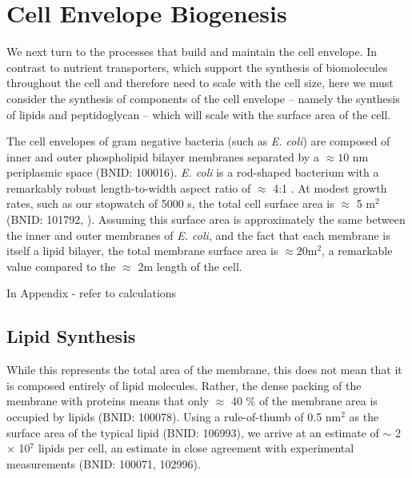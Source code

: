 \section{Cell Envelope Biogenesis}
We next turn to the processes that build and maintain the cell envelope.
In contrast to nutrient transporters, which support the synthesis of biomolecules
throughout the cell and therefore need to scale with the cell size,
here we must consider the synthesis of components of the cell envelope -- namely the synthesis of
lipids and peptidoglycan -- which will scale with the surface area of the cell.

The cell envelopes of gram negative bacteria (such as \textit{E. coli}) are
composed of inner and outer phospholipid bilayer membranes separated by a
$\approx 10$ nm periplasmic space (BNID: 100016). \textit{E. coli} is a
rod-shaped bacterium with a remarkably robust length-to-width aspect ratio of
$\approx$ 4:1 \citep{harris2018}. At modest growth rates, such as our stopwatch of
5000 s, the total cell surface area is $\approx$ 5 \textmu m$^2$ (BNID: 101792,
\cite{milo2010}). Assuming this surface area is approximately the same between
the inner and outer membranes of \textit{E. coli}, and the fact that each
membrane is itself a lipid bilayer, the total membrane surface area is $\approx 20$\textmu m$^2$, a
remarkable value compared to the $\approx$ 2\textmu m length of the cell.


In Appendix \nameref{} - refer to calculations



\subsection{Lipid Synthesis}

While this represents the total area of the membrane, this does not mean that it
is composed entirely of lipid molecules. Rather, the dense packing of the
membrane with proteins means that only $\approx$ 40 \% of the membrane area is
occupied by lipids (BNID: 100078). Using a rule-of-thumb of 0.5
nm$^2$ as the surface area of the typical lipid (BNID: 106993),
we arrive at an estimate of $\sim$ 2 $\times$ 10$^7$ lipids per cell, an
estimate in close agreement with experimental measurements (BNID: 100071,
102996).

